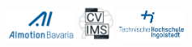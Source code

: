 

\begin{titlepage}	
	\begin{figure}[!h]
		\centering
			\includegraphics[width={0.2\textwidth}]{images/ai-motion.png}	
			\hfill
			\includegraphics[width={0.1\textwidth}]{images/cvims.png}	
			\hfill
			\includegraphics[width={0.2\textwidth}]{images/thiRGB.jpg}	
		\end{figure}																			
	
	\begin{center}
		\hrulefill 
	\end{center}
	

\end{titlepage}
